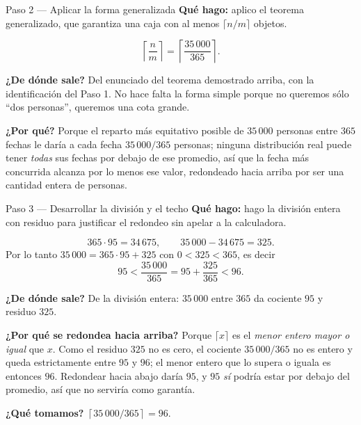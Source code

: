 \documentclass[11pt]{article}
\begin{document}
\begin{paso}{Paso 2 --- Aplicar la forma generalizada}
\textbf{Qué hago:} aplico el teorema generalizado, que garantiza una caja con al menos $\lceil n/m\rceil$ objetos.

\[
\left\lceil \frac{n}{m} \right\rceil=\left\lceil \frac{35\,000}{365} \right\rceil .
\]

\textbf{¿De dónde sale?} Del enunciado del teorema demostrado arriba, con la identificación del Paso 1. No hace falta la forma simple porque no queremos sólo ``dos personas'', queremos una cota grande.

\textbf{¿Por qué?} Porque el reparto más equitativo posible de $35\,000$ personas entre $365$ fechas le daría a cada fecha $35\,000/365$ personas; ninguna distribución real puede tener \emph{todas} sus fechas por debajo de ese promedio, así que la fecha más concurrida alcanza por lo menos ese valor, redondeado hacia arriba por ser una cantidad entera de personas.
\end{paso}

\begin{paso}{Paso 3 --- Desarrollar la división y el techo}
\textbf{Qué hago:} hago la división entera con residuo para justificar el redondeo sin apelar a la calculadora.

\[
365\cdot 95 = 34\,675, \qquad 35\,000-34\,675 = 325 .
\]
Por lo tanto $35\,000 = 365\cdot 95 + 325$ con $0<325<365$, es decir
\[
95 < \frac{35\,000}{365} = 95+\frac{325}{365} < 96 .
\]

\textbf{¿De dónde sale?} De la división entera: $35\,000$ entre $365$ da cociente $95$ y residuo $325$.

\textbf{¿Por qué se redondea hacia arriba?} Porque $\lceil x\rceil$ es el \emph{menor entero mayor o igual} que $x$. Como el residuo $325$ no es cero, el cociente $35\,000/365$ no es entero y queda estrictamente entre $95$ y $96$; el menor entero que lo supera o iguala es entonces $96$. Redondear hacia abajo daría $95$, y $95$ \emph{sí} podría estar por debajo del promedio, así que no serviría como garantía.

\textbf{¿Qué tomamos?} $\left\lceil 35\,000/365 \right\rceil = 96$.
\end{paso}
\end{document}
